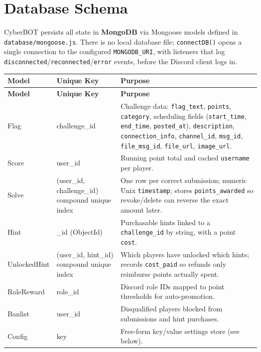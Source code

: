 \documentclass[12pt,a4paper]{report}
\newcommand{\file}[1]{\texttt{\color{cyberpurple!80!black}#1}}
\begin{document}
\chapter{Database Schema}

CyberBOT persists all state in \textbf{MongoDB} via Mongoose models defined in
\file{database/mongoose.js}. There is no local database file; \texttt{connectDB()} opens a single
connection to the configured \texttt{MONGODB\_URI}, with listeners that log
\texttt{disconnected}/\texttt{reconnected}/\texttt{error} events, before the Discord client logs
in.

\begin{longtable}{>{\ttfamily}p{3.6cm} p{3.4cm} p{5.8cm}}
\toprule
\textbf{Model} & \textbf{Unique Key} & \textbf{Purpose} \\
\midrule
\endfirsthead
\toprule
\textbf{Model} & \textbf{Unique Key} & \textbf{Purpose} \\
\midrule
\endhead
Flag           & challenge\_id            & Challenge data: \texttt{flag\_text}, \texttt{points}, \texttt{category}, scheduling fields (\texttt{start\_time}, \texttt{end\_time}, \texttt{posted\_at}), \texttt{description}, \texttt{connection\_info}, \texttt{channel\_id}, \texttt{msg\_id}, \texttt{file\_msg\_id}, \texttt{file\_url}, \texttt{image\_url}. \\[0.3cm]
Score          & user\_id                 & Running point total and cached \texttt{username} per player. \\[0.3cm]
Solve          & (user\_id, challenge\_id) compound unique index & One row per correct submission; numeric Unix \texttt{timestamp}; stores \texttt{points\_awarded} so revoke/delete can reverse the exact amount later. \\[0.3cm]
Hint           & \_id (ObjectId)          & Purchasable hints linked to a \texttt{challenge\_id} by string, with a point \texttt{cost}. \\[0.3cm]
UnlockedHint   & (user\_id, hint\_id) compound unique index & Which players have unlocked which hints; records \texttt{cost\_paid} so refunds only reimburse points actually spent. \\[0.3cm]
RoleReward     & role\_id                 & Discord role IDs mapped to point thresholds for auto-promotion. \\[0.3cm]
Banlist        & user\_id                 & Disqualified players blocked from submissions and hint purchases. \\[0.3cm]
Config         & key                      & Free-form key/value settings store (see below). \\
\bottomrule
\end{longtable}
\end{document}
